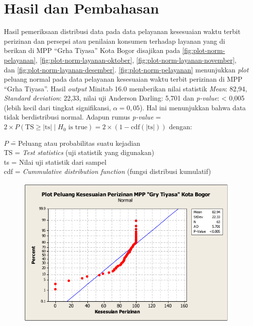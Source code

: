\section{Hasil dan Pembahasan}


Hasil pemeriksaan distribusi data pada data pelayanan kesesuaian waktu terbit perizinan dan persepsi atau penilaian konsumen terhadap layanan yang di berikan di MPP ``Grha Tiyasa'' Kota Bogor disajikan pada \autoref{fig:plot-norm-pelayanan}, \autoref{fig:plot-norm-layanan-oktober}, \autoref{fig:plot-norm-layanan-november}, dan  \autoref{fig:plot-norm-layanan-desember}. \autoref{fig:plot-norm-pelayanan} menunjukkan \textit{plot} peluang normal pada data pelayanan kesesuaian waktu terbit perizinan di MPP ``Grha Tiyasa''. Hasil \textit{output} Minitab 16.0 memberikan nilai statistik \textit{Mean}: 82,94, \textit{Standard deviation}: 22,33, nilai uji Anderson Darling: 5,701 dan \textit{p-value}: < 0,005 (lebih kecil dari tingkat signifikansi, $\alpha = 0{,}05$). Hal ini menunjukkan bahwa data tidak berdistribusi normal. Adapun rumus \textit{p-value} = $2 \times P\left( \mathrm{TS} \geq |\mathrm{ts}| \;\vert\; H_0 \text{ is true} \right) = 2 \times \left(1 - \mathrm{cdf}\left(|\mathrm{ts}|\right) \right)$ dengan:

\begin{tabbing}
    $P$ \; \= = Peluang atau probabilitas suatu kejadian \\
    TS \> = \textit{Test statistics} (uji statistik yang digunakan) \\
    ts \> = Nilai uji statistik dari sampel \\
    cdf \> = \textit{Cummulative distribution function} (fungsi distribusi kumulatif)
\end{tabbing}

\begin{figure}[H]
    \centering
    \includegraphics[width=.7\linewidth]{pdf/Plot-peluang-normal-kesesuaian-waktu-terbit-perizinan.pdf}
    \label{fig:plot-norm-pelayanan}
\end{figure}

